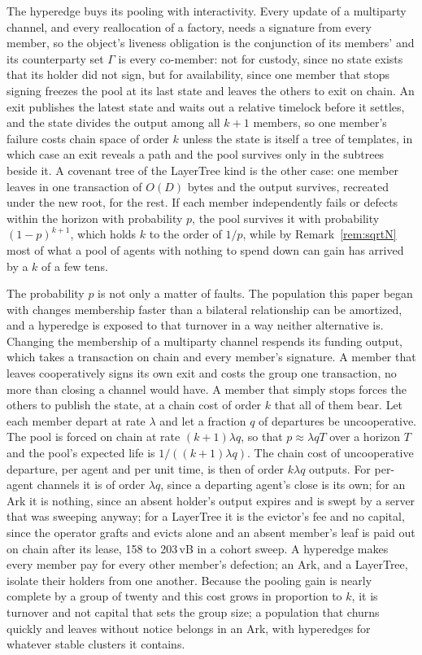 \documentclass[11pt]{article}
\theoremstyle{plain}
\theoremstyle{definition}
\theoremstyle{remark}
\begin{document}
The hyperedge buys its pooling with interactivity. Every update of a multiparty channel, and every reallocation of a factory, needs a signature from every member, so the object's liveness obligation is the conjunction of its members' and its counterparty set $\Gamma$ is every co-member: not for custody, since no state exists that its holder did not sign, but for availability, since one member that stops signing freezes the pool at its last state and leaves the others to exit on chain. An exit publishes the latest state and waits out a relative timelock before it settles, and the state divides the output among all $k+1$ members, so one member's failure costs chain space of order $k$ unless the state is itself a tree of templates, in which case an exit reveals a path and the pool survives only in the subtrees beside it. A covenant tree of the LayerTree kind is the other case: one member leaves in one transaction of $O(D)$ bytes and the output survives, recreated under the new root, for the rest. If each member independently fails or defects within the horizon with probability $p$, the pool survives it with probability $(1-p)^{k+1}$, which holds $k$ to the order of $1/p$, while by Remark~\ref{rem:sqrtN} most of what a pool of agents with nothing to spend down can gain has arrived by a $k$ of a few tens.

The probability $p$ is not only a matter of faults. The population this paper began with changes membership faster than a bilateral relationship can be amortized, and a hyperedge is exposed to that turnover in a way neither alternative is. Changing the membership of a multiparty channel respends its funding output, which takes a transaction on chain and every member's signature. A member that leaves cooperatively signs its own exit and costs the group one transaction, no more than closing a channel would have. A member that simply stops forces the others to publish the state, at a chain cost of order $k$ that all of them bear. Let each member depart at rate $\lambda$ and let a fraction $q$ of departures be uncooperative. The pool is forced on chain at rate $(k+1)\lambda q$, so that $p\approx\lambda qT$ over a horizon $T$ and the pool's expected life is $1/((k+1)\lambda q)$. The chain cost of uncooperative departure, per agent and per unit time, is then of order $k\lambda q$ outputs. For per-agent channels it is of order $\lambda q$, since a departing agent's close is its own; for an Ark it is nothing, since an absent holder's output expires and is swept by a server that was sweeping anyway; for a LayerTree it is the evictor's fee and no capital, since the operator grafts and evicts alone and an absent member's leaf is paid out on chain after its lease, 158 to 203\,vB in a cohort sweep. A hyperedge makes every member pay for every other member's defection; an Ark, and a LayerTree, isolate their holders from one another. Because the pooling gain is nearly complete by a group of twenty and this cost grows in proportion to $k$, it is turnover and not capital that sets the group size; a population that churns quickly and leaves without notice belongs in an Ark, with hyperedges for whatever stable clusters it contains.
\end{document}
